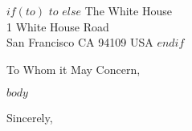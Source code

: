 \documentclass[11pt]{letter}
\begin{document}
\begin{letter}
$if(to)$
{$to$}
$else$
{The White House \\ 1 White House Road \\ San Francisco CA 94109 USA}
$endif$
\opening{To Whom it May Concern,}

$body$

\closing{Sincerely,}
\end{letter}
\end{document}
